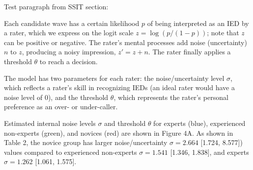 \documentclass{article}
\begin{document}
Test paragraph from SSIT section:

Each candidate wave has a certain likelihood $p$ of being interpreted as an IED by a rater, which we express on the logit scale $z=\log(p/(1-p))$; note that $z$ can be positive or negative. The rater's mental processes add noise (uncertainty) $n$ to $z$, producing a noisy impression, $z' = z+n$. The rater finally applies a threshold $\theta$ to reach a decision.

The model has two parameters for each rater: the noise/uncertainty level $\sigma$, which reflects a rater's skill in recognizing IEDs (an ideal rater would have a noise level of 0), and the threshold $\theta$, which represents the rater's personal preference as an over- or under-caller.

Estimated internal noise levels $\sigma$ and threshold $\theta$ for experts (blue), experienced non-experts (green), and novices (red) are shown in Figure 4A. As shown in Table 2, the novice group has larger noise/uncertainty $\sigma = 2.664$ [1.724, 8.577]) values compared to experienced non-experts $\sigma = 1.541$ [1.346, 1.838], and experts $\sigma = 1.262$ [1.061, 1.575].
\end{document}
